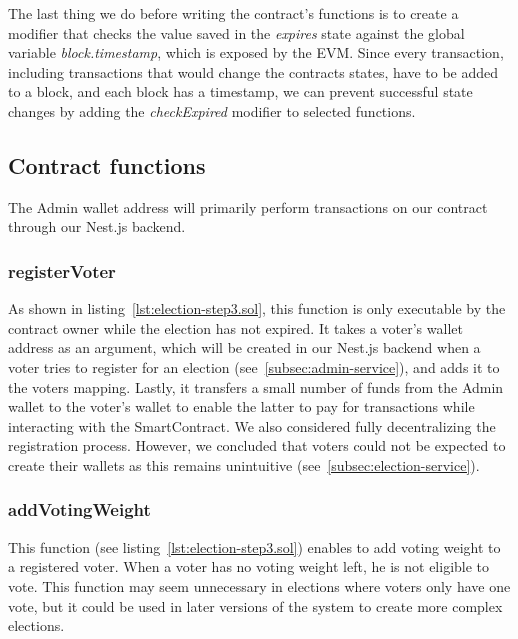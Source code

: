 The last thing we do before writing the contract's functions is to create a modifier that checks the value saved in the \emph{expires} state against the global variable \emph{block.timestamp}, which is exposed by the \gls{EVM}.
Since every transaction, including transactions that would change the contracts states, have to be added to a block, and each block has a timestamp, we can prevent successful state changes by adding the \emph{checkExpired} modifier to selected functions.

\subsection{Contract functions}\label{subsec:contract-functions}

The \gls{Admin} wallet address will primarily perform transactions on our contract through our Nest.js backend.


\subsubsection{registerVoter}

As shown in listing~\ref{lst:election-step3.sol}, this function is only executable by the contract owner while the election has not expired.
It takes a voter’s wallet address as an argument, which will be created in our Nest.js backend when a voter tries to register for an election (see~\cref{subsec:admin-service}), and adds it to the voters mapping.
Lastly, it transfers a small number of funds from the \gls{Admin} wallet to the voter’s wallet to enable the latter to pay for transactions while interacting with the \gls{SmartContract}.
We also considered fully decentralizing the registration process.
However, we concluded that voters could not be expected to create their wallets as this remains unintuitive (see~\cref{subsec:election-service}).

\subsubsection{addVotingWeight}

This function (see listing~\ref{lst:election-step3.sol}) enables  to add voting weight to a registered voter.
When a voter has no voting weight left, he is not eligible to vote.
This function may seem unnecessary in elections where voters only have one vote, but it could be used in later versions of the system to create more complex elections.


